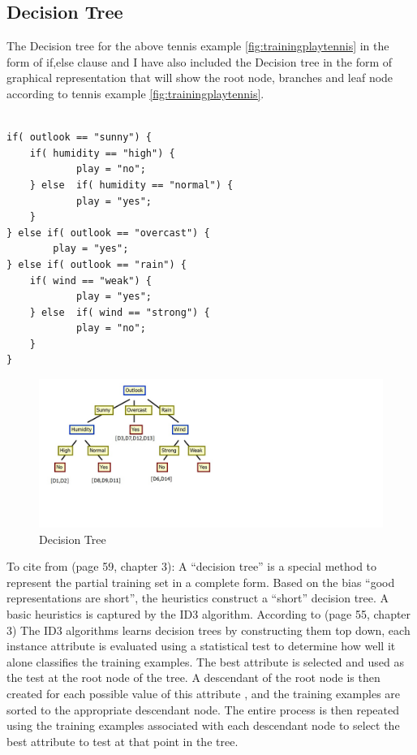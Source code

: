 \documentclass{report}
\begin{document}
\pagebreak

\subsection{Decision Tree}
\label{sec:dec}

The Decision tree for the above tennis example \ref{fig:trainingplaytennis} in the form of if,else clause and I have also included the Decision tree in the form of graphical representation that will show the root node, branches and leaf node according to tennis example \ref{fig:trainingplaytennis}.
\begin{lstlisting}

if( outlook == "sunny") {
	if( humidity == "high") {
			play = "no";
	} else 	if( humidity == "normal") {
			play = "yes";
	}
} else if( outlook == "overcast") {
		play = "yes";
} else if( outlook == "rain") {
	if( wind == "weak") {
			play = "yes";
	} else 	if( wind == "strong") {
			play = "no";
	}
}

\end{lstlisting}

\begin{figure}[hbtp]
\centering
\includegraphics[width = 10in]{DecisionTree.jpg}
\caption{Decision Tree}
\end{figure}

\pagebreak
To cite from \cite{Mitchell1997MachineLearning}(page 59, chapter 3): A ``decision tree'' is a special method to represent the partial training set in a complete form. Based on the bias ``good representations are short'', the heuristics construct a ``short'' decision tree. A basic heuristics is captured by the ID3 algorithm. According to \cite{Mitchell1997MachineLearning}(page 55, chapter 3) The ID3 algorithms learns decision trees by constructing them top down, each instance attribute is evaluated using a statistical test to determine how well it alone classifies the training examples. The best attribute is selected and used as the test at the root node of the tree. A descendant of the root node is then created for each possible value of this attribute , and the training examples are sorted to the appropriate descendant node. The entire process is then repeated using the training examples associated with each descendant node to select the best attribute to test at that point in the tree. 
\end{document}
